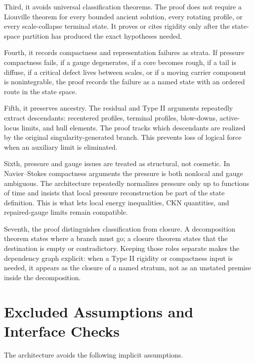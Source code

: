 \documentclass[11pt]{amsart}
\begin{document}
Third, it avoids universal classification theorems.  The proof does not require a Liouville theorem for every bounded ancient solution, every rotating profile, or every scale-collapse terminal state.  It proves or cites rigidity only after the state-space partition has produced the exact hypotheses needed.

Fourth, it records compactness and representation failures as strata.  If pressure compactness fails, if a gauge degenerates, if a core becomes rough, if a tail is diffuse, if a critical defect lives between scales, or if a moving carrier component is nonintegrable, the proof records the failure as a named state with an ordered route in the state space.

Fifth, it preserves ancestry.  The residual and Type II arguments repeatedly extract descendants: recentered profiles, terminal profiles, blow-downs, active-locus limits, and hull elements.  The proof tracks which descendants are realized by the original singularity-generated branch.  This prevents loss of logical force when an auxiliary limit is eliminated.

Sixth, pressure and gauge issues are treated as structural, not cosmetic.  In Navier--Stokes compactness arguments the pressure is both nonlocal and gauge ambiguous.  The architecture repeatedly normalizes pressure only up to functions of time and insists that local pressure reconstruction be part of the state definition.  This is what lets local energy inequalities, CKN quantities, and repaired-gauge limits remain compatible.

Seventh, the proof distinguishes classification from closure.  A decomposition theorem states where a branch must go; a closure theorem states that the destination is empty or contradictory.  Keeping those roles separate makes the dependency graph explicit: when a Type II rigidity or compactness input is needed, it appears as the closure of a named stratum, not as an unstated premise inside the decomposition.

\section{Excluded Assumptions and Interface Checks}

The architecture avoids the following implicit assumptions.
\end{document}
